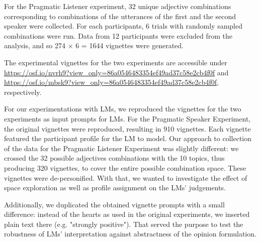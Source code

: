 \documentclass[11pt]{article}
\begin{document}
For the Pragmatic Listener experiment, 32 unique adjective combinations corresponding to combinations of the utterances of the first and the second speaker were collected. For each participants, 6 trials with randomly sampled combinations were run. Data from 12 participants were excluded from the analysis, and so 274 $\times$ 6 = 1644 vignettes were generated.

The experimental vignettes for the two experiments are accessible under \url{https://osf.io/nvrh9?view_only=86a0546483354ef49ad37c58e2cb4f0f} and \url{https://osf.io/mbsk9?view_only=86a0546483354ef49ad37c58e2cb4f0f}, respectively.


For our experimentations with LMs, we reproduced the vignettes for the two experiments as input prompts for LMs. For the Pragmatic Speaker Experiment, the original vignettes were reproduced, resulting in 910 vignettes. Each vignette featured the participant profile for the LM to model. Our approach to collection of the data for the Pragmatic Listener Experiment was slightly different: we crossed the 32 possible adjectives combinations with the 10 topics, thus producing 320 vignettes, to cover the entire possible combination space. These vignettes were de-personified. With that, we wanted to investigate the effect of space exploration as well as profile assignment on the LMs' judgements.

Additionally, we duplicated the obtained vignette prompts with a small difference: instead of the hearts as used in the original experiments, we inserted plain text there (e.g. "strongly positive"). That served the purpose to test the robustness of LMs' interpretation against abstractness of the opinion formulation.


\end{document}

